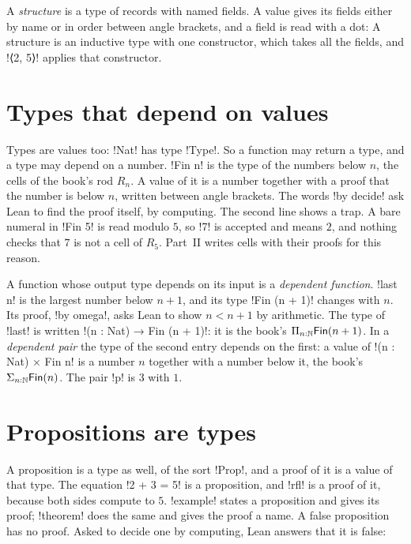 A \emph{structure} is a type of records with named fields. A value gives its
fields either by name or in order between angle brackets, and a field is read
with a dot:
A structure is an inductive type with one constructor, which takes all the
fields, and \li!⟨2, 5⟩! applies that constructor.

\section*{Types that depend on values}

Types are values too: \li!Nat! has type \li!Type!. So a function may return a
type, and a type may depend on a number. \li!Fin n! is the type of the
numbers below $n$, the cells of the book's rod $R_n$. A value of it is a
number together with a proof that the number is below $n$, written between
angle brackets. The words \li!by decide! ask Lean to find the proof itself,
by computing.
The second line shows a trap. A bare numeral in \li!Fin 5! is read modulo
$5$, so \li!7! is accepted and means $2$, and nothing checks that $7$ is not
a cell of $R_5$. Part~II writes cells with their proofs for this reason.

A function whose output type depends on its input is a \emph{dependent
function}. \li!last n! is the largest number below $n+1$, and its type
\li!Fin (n + 1)! changes with $n$. Its proof, \li!by omega!, asks Lean to show
$n<n+1$ by arithmetic.
The type of \li!last! is written \li!(n : Nat) → Fin (n + 1)!: it is the
book's $\Pi_{n:\mathbb N}\mathsf{Fin}(n+1)$. In a \emph{dependent pair}
the type of the second entry depends on the first: a value of
\li!(n : Nat) × Fin n! is a number $n$ together with a number below it, the
book's $\Sigma_{n:\mathbb N}\mathsf{Fin}(n)$. The pair \li!p! is $3$ with
$1$.

\section*{Propositions are types}

A proposition is a type as well, of the sort \li!Prop!, and a proof of it is a
value of that type. The equation \li!2 + 3 = 5! is a proposition, and
\li!rfl! is a proof of it, because both sides compute to $5$. \li!example!
states a proposition and gives its proof; \li!theorem! does the same and
gives the proof a name.
A false proposition has no proof. Asked to decide one by computing, Lean
answers that it is false:

